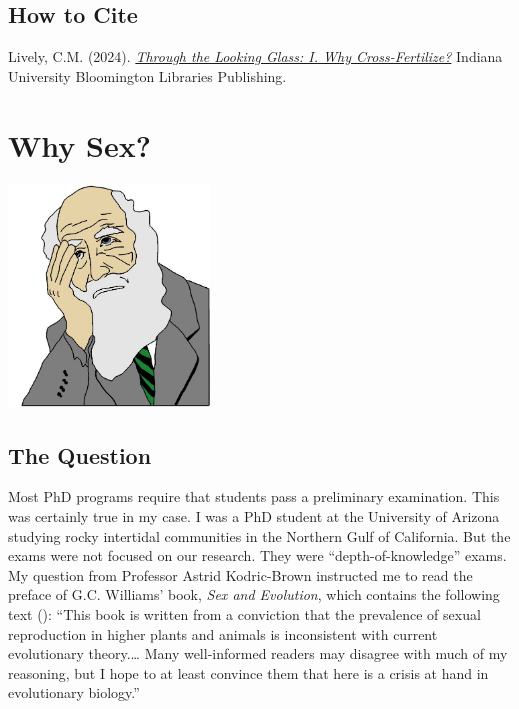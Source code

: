 \documentclass[
  letterpaper,
]{book}
\begin{document}
\section*{How to Cite}\label{how-to-cite}


Lively, C.M. (2024).
\href{https://doi.org/10.5967/GBD3-KA07}{\emph{Through the Looking
Glass: I. Why Cross-Fertilize?}} Indiana University Bloomington
Libraries Publishing.


\chapter{Why Sex?}\label{sec-why-sex}

\begin{center}
\includegraphics[width=0.4\textwidth,height=\textheight]{images/fig1-1.jpeg}
\end{center}

\section{The Question}\label{the-question}

Most PhD programs require that students pass a preliminary examination.
This was certainly true in my case. I was a PhD student at the
University of Arizona studying rocky intertidal communities in the
Northern Gulf of California. But the exams were not focused on our
research. They were ``depth-of-knowledge'' exams. My question from
Professor Astrid Kodric-Brown instructed me to read the preface of G.C.
Williams' book, \emph{Sex and Evolution}, which contains the following
text (): ``This book is written from a
conviction that the prevalence of sexual reproduction in higher plants
and animals is inconsistent with current evolutionary theory.\ldots{}
Many well-informed readers may disagree with much of my reasoning, but I
hope to at least convince them that here is a crisis at hand in
evolutionary biology.''
\end{document}

